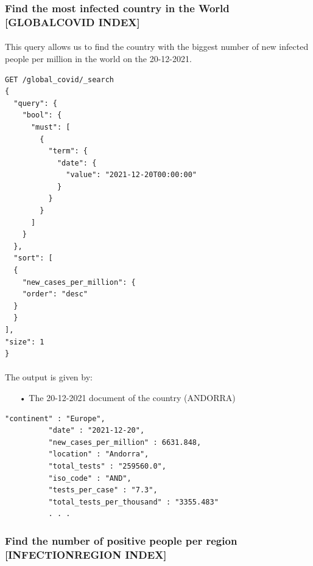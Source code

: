 \documentclass[a4paper,12pt]{article}
\begin{document}
\subsubsection{Find the most infected country in the World [GLOBAL\textunderscore COVID INDEX]  }
\paragraph{} This query allows us to find the country with the biggest number of new infected people per million in the world on the 20-12-2021.
\begin{tcolorbox}[colback=green!5!white,colframe=green!75!black,title=QUERY]
\begin{verbatim}
GET /global_covid/_search
{ 
  "query": {
    "bool": {
      "must": [
        {
          "term": {
            "date": {
              "value": "2021-12-20T00:00:00"
            }
          }
        }
      ]
    }
  }, 
  "sort": [
  {
    "new_cases_per_million": {
    "order": "desc"
  }
  }
],
"size": 1
}
\end{verbatim}
\end{tcolorbox}

\paragraph{} The output is given by: 
\begin{itemize}[noitemsep]
\item[•] The 20-12-2021 document of the country (ANDORRA)
\end{itemize}

\begin{tcolorbox}[colback=red!5!white,colframe=red!75!black,title=OUTPUT]
\begin{verbatim}
"continent" : "Europe",
          "date" : "2021-12-20",
          "new_cases_per_million" : 6631.848,
          "location" : "Andorra",
          "total_tests" : "259560.0",
          "iso_code" : "AND",
          "tests_per_case" : "7.3",
          "total_tests_per_thousand" : "3355.483"
          . . .
\end{verbatim}
\end{tcolorbox}

\subsubsection{Find the number of positive people per region [INFECTION\textunderscore REGION INDEX]  }
\end{document}
